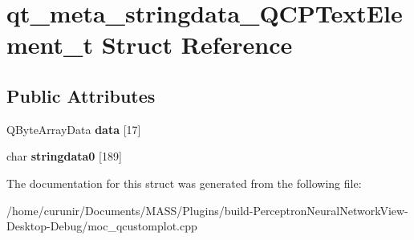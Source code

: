 \hypertarget{structqt__meta__stringdata___q_c_p_text_element__t}{}\section{qt\+\_\+meta\+\_\+stringdata\+\_\+\+Q\+C\+P\+Text\+Element\+\_\+t Struct Reference}
\label{structqt__meta__stringdata___q_c_p_text_element__t}
\subsection*{Public Attributes}
\begin{DoxyCompactItemize}
\item 
Q\+Byte\+Array\+Data {\bfseries data} \mbox{[}17\mbox{]}\hypertarget{structqt__meta__stringdata___q_c_p_text_element__t_aea7ed3e03af38c139400f8c837a108bf}{}\label{structqt__meta__stringdata___q_c_p_text_element__t_aea7ed3e03af38c139400f8c837a108bf}

\item 
char {\bfseries stringdata0} \mbox{[}189\mbox{]}\hypertarget{structqt__meta__stringdata___q_c_p_text_element__t_a7307363ad48472f7f131b7b59640d43b}{}\label{structqt__meta__stringdata___q_c_p_text_element__t_a7307363ad48472f7f131b7b59640d43b}

\end{DoxyCompactItemize}


The documentation for this struct was generated from the following file\+:\begin{DoxyCompactItemize}
\item 
/home/curunir/\+Documents/\+M\+A\+S\+S/\+Plugins/build-\/\+Perceptron\+Neural\+Network\+View-\/\+Desktop-\/\+Debug/moc\+\_\+qcustomplot.\+cpp\end{DoxyCompactItemize}

